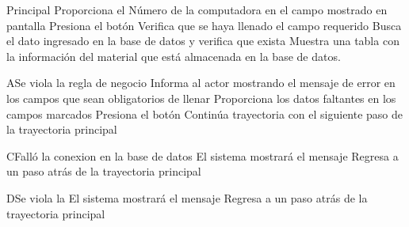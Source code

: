 
\begin{UCtrayectoria}{Principal}
		\UCpaso[\UCactor] Proporciona el Número de la computadora en el campo mostrado en pantalla 
		\UCpaso[\UCactor] Presiona el botón 
		\UCpaso[\UCsist] Verifica que se haya llenado el campo requerido 
		\UCpaso[\UCsist] Busca el dato ingresado en la base de datos  y verifica que exista 
		\UCpaso[\UCsist] Muestra una tabla con la información del material que está almacenada en la base de datos.
\end{UCtrayectoria}



\begin{UCtrayectoriaA}{A}{Se viola la regla de negocio }	
			\UCpaso[\UCsist] Informa al actor mostrando el mensaje de error  en los campos que sean obligatorios de llenar
			\UCpaso[\UCactor] Proporciona los datos faltantes en los campos marcados 
			\UCpaso[\UCactor] Presiona el botón 
			\UCpaso[\UCsist] Continúa trayectoria con el siguiente paso de la trayectoria principal 
\end{UCtrayectoriaA}

\begin{UCtrayectoriaA}{C}{Falló la conexion en la base de datos}
			\UCpaso[\UCsist] El sistema mostrará el mensaje 
			\UCpaso[\UCsist] Regresa a un paso atrás de la trayectoria principal 
\end{UCtrayectoriaA}

\begin{UCtrayectoriaA}{D}{Se viola la }
			\UCpaso[\UCsist] El sistema mostrará el mensaje 
			\UCpaso[\UCsist] Regresa a un paso atrás de la trayectoria principal 
\end{UCtrayectoriaA}





